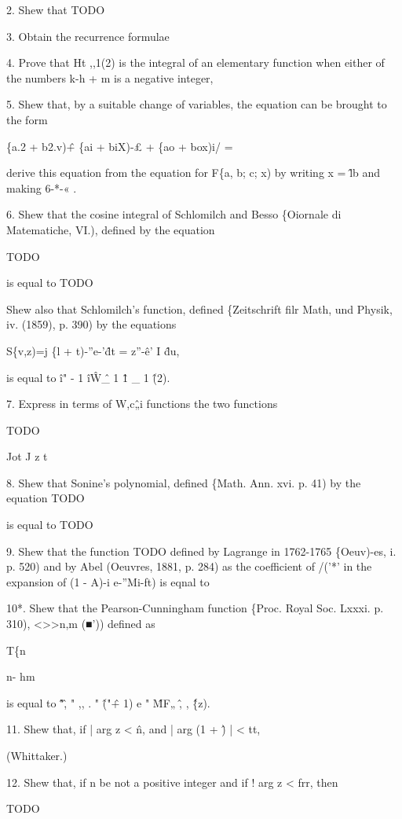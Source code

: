 2. Shew that TODO

3. Obtain the recurrence formulae

4. Prove that Ht ,,1(2) is the integral of an elementary function when
either of the numbers k-h + m is a negative integer,

5. Shew that, by a suitable change of variables, the equation can be
brought to the form

\{a.2 + b2.v)\^ + \{ai + biX)-£ + \{ao + box)i/ =

derive this equation from the equation for F\{a, b; c; x) by writing x
= \^lb and making 6-*-« .

6. Shew that the cosine integral of Schlomilch and Besso \{Oiornale di
Matematiche, VI.), defined by the equation

TODO

is equal to TODO

Shew also that Schlomilch's function, defined \{Zeitschrift filr Math,
und Physik, iv. (1859), p. 390) by the equations

S\{v,z)=j \{l + t)-''e-'\^dt = z''-\^e' I \^du,

is equal to \^i" - 1 \^i\^ W\^ \_ 1 \^ 1 \_ 1 \^ (2).

7. Express in terms of W,c\^„i functions the two functions

TODO

Jot J z t

8. Shew that Sonine's polynomial, defined \{Math. Ann. xvi. p. 41) by
the equation TODO

is equal to TODO

%
%

9. Shew that the function TODO defined by Lagrange in 1762-1765
\{Oeuv)-es, i. p. 520) and by Abel (Oeuvres, 1881, p. 284) as the
coefficient of /('*' in the expansion of (1 - A)-i e-''Mi-ft) is eqnal
to

10*. Shew that the Pearson-Cunningham function \{Proc. Royal Soc.
Lxxxi. p. 310), <>>n,m (■')) defined as

T\{n

n- hm

is equal to \^ "\^, " ,, . " \^ ("\^ + 1) e " \^MF„ \^ , , \^ \{z).

11. Shew that, if | arg z < \^n, and | arg (1 + \^) | < tt,

(Whittaker.)

12. Shew that, if n be not a positive integer and if ! arg z < frr,
then

TODO

